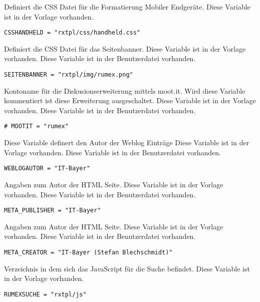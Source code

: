 {Definiert die CSS Datei für die Formatierung Mobiler Endgeräte.}
{Diese Variable ist in der Vorlage vorhanden.}
{}
{\scriptsize
\begin{Verbatim}
CSSHANDHELD = "rxtpl/css/handheld.css"
\end{Verbatim}
}



{Definiert die CSS Datei für das Seitenbanner.}
{Diese Variable ist in der Vorlage vorhanden.}
{Diese Variable ist in der Benutzerdatei vorhanden.}
{\scriptsize
\begin{Verbatim}
SEITENBANNER = "rxtpl/img/rumex.png"
\end{Verbatim}
}



{Kontoname für die Diskusionserweiterung mittels moot.it. 
Wird diese Variable kommentiert ist diese Erweiterung ausgeschaltet.}
{Diese Variable ist in der Vorlage vorhanden.}
{Diese Variable ist in der Benutzerdatei vorhanden.}
{\scriptsize
\begin{Verbatim}
# MOOTIT = "rumex"
\end{Verbatim}
}



{Diese Variable definert den Autor der Weblog Einträge}
{Diese Variable ist in der Vorlage vorhanden.}
{Diese Variable ist in der Benutzerdatei vorhanden.}
{\scriptsize
\begin{Verbatim}
WEBLOGAUTOR = "IT-Bayer"
\end{Verbatim}
}



{Angaben zum Autor der HTML Seite.}
{Diese Variable ist in der Vorlage vorhanden.}
{Diese Variable ist in der Benutzerdatei vorhanden.}
{\scriptsize
\begin{Verbatim}
META_PUBLISHER = "IT-Bayer"
\end{Verbatim}
}



{Angaben zum Autor der HTML Seite.}
{Diese Variable ist in der Vorlage vorhanden.}
{Diese Variable ist in der Benutzerdatei vorhanden.}
{\scriptsize
\begin{Verbatim}
META_CREATOR = "IT-Bayer (Stefan Blechschmidt)"
\end{Verbatim}
}



{Verzeichnis in dem sich das JavaScript für die Suche befindet.}
{Diese Variable ist in der Vorlage vorhanden.}
{}
{\scriptsize
\begin{Verbatim}
RUMEXSUCHE = "rxtpl/js"
\end{Verbatim}
}



